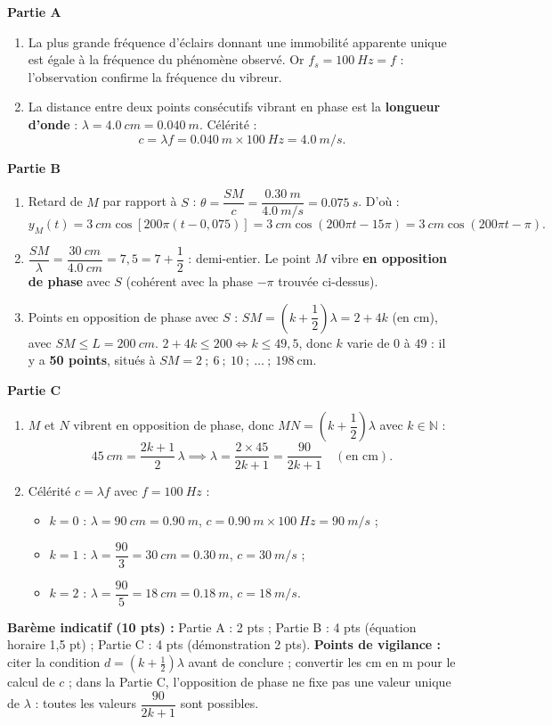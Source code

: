 \documentclass[11pt]{article}
\begin{document}
\begin{corrige}
\textbf{Partie A}
\begin{enumerate}
\item La plus grande fréquence d'éclairs donnant une immobilité apparente unique est égale à la fréquence du phénomène observé. Or $f_s = \SI{100}{Hz} = f$ : l'observation confirme la fréquence du vibreur.
\item La distance entre deux points consécutifs vibrant en phase est la \textbf{longueur d'onde} : $\lambda = \SI{4,0}{cm} = \SI{0,040}{m}$. Célérité :
\[ c = \lambda f = \SI{0,040}{m} \times \SI{100}{Hz} = \SI{4,0}{m/s}. \]
\end{enumerate}
\textbf{Partie B}
\begin{enumerate}
\item Retard de $M$ par rapport à $S$ : $\theta = \dfrac{SM}{c} = \dfrac{\SI{0,30}{m}}{\SI{4,0}{m/s}} = \SI{0,075}{s}$. D'où :
\[ y_M(t) = \SI{3}{cm}\cos\left[200\pi(t - 0,075)\right] = \SI{3}{cm}\cos(200\pi t - 15\pi) = \SI{3}{cm}\cos(200\pi t - \pi). \]
\item $\dfrac{SM}{\lambda} = \dfrac{\SI{30}{cm}}{\SI{4,0}{cm}} = 7,5 = 7 + \dfrac{1}{2}$ : demi-entier. Le point $M$ vibre \textbf{en opposition de phase} avec $S$ (cohérent avec la phase $-\pi$ trouvée ci-dessus).
\item Points en opposition de phase avec $S$ : $SM = \left(k+\dfrac{1}{2}\right)\lambda = 2 + 4k$ (en cm), avec $SM \leq L = \SI{200}{cm}$.
$2 + 4k \leq 200 \iff k \leq 49,5$, donc $k$ varie de $0$ à $49$ : il y a \textbf{50 points}, situés à $SM = 2\ ;\ 6\ ;\ 10\ ;\ \ldots\ ;\ 198\ \text{cm}$.
\end{enumerate}
\textbf{Partie C}
\begin{enumerate}
\item $M$ et $N$ vibrent en opposition de phase, donc $MN = \left(k+\dfrac{1}{2}\right)\lambda$ avec $k \in \mathbb{N}$ :
\[ \SI{45}{cm} = \frac{2k+1}{2}\,\lambda \implies \lambda = \frac{2 \times 45}{2k+1} = \frac{90}{2k+1} \quad (\text{en cm}). \]
\item Célérité $c = \lambda f$ avec $f = \SI{100}{Hz}$ :
\begin{itemize}
\item $k = 0$ : $\lambda = \SI{90}{cm} = \SI{0,90}{m}$, $c = \SI{0,90}{m} \times \SI{100}{Hz} = \SI{90}{m/s}$ ;
\item $k = 1$ : $\lambda = \dfrac{90}{3} = \SI{30}{cm} = \SI{0,30}{m}$, $c = \SI{30}{m/s}$ ;
\item $k = 2$ : $\lambda = \dfrac{90}{5} = \SI{18}{cm} = \SI{0,18}{m}$, $c = \SI{18}{m/s}$.
\end{itemize}
\end{enumerate}
\textbf{Barème indicatif (10 pts) :} Partie A : 2 pts ; Partie B : 4 pts (équation horaire 1,5 pt) ; Partie C : 4 pts (démonstration 2 pts).
\textbf{Points de vigilance :} citer la condition $d = \left(k+\tfrac12\right)\lambda$ avant de conclure ; convertir les cm en m pour le calcul de $c$ ; dans la Partie C, l'opposition de phase ne fixe pas une valeur unique de $\lambda$ : toutes les valeurs $\dfrac{90}{2k+1}$ sont possibles.
\end{corrige}
\end{document}
